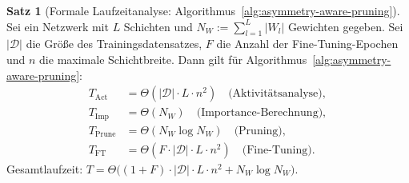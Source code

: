 \documentclass[a4paper,12pt]{report}
\theoremstyle{definition}
\newtheorem{satz}{Satz}
\begin{document}
	\begin{satz}[Formale Laufzeitanalyse: Algorithmus~\ref{alg:asymmetry-aware-pruning}]
		\label{satz:laufzeit-pruning}
		Sei ein Netzwerk mit $L$ Schichten und $N_W := \sum_{l=1}^L |W_l|$ Gewichten gegeben. Sei $|\mathcal{D}|$ die Größe des Trainingsdatensatzes, $F$ die Anzahl der Fine-Tuning-Epochen und $n$ die maximale Schichtbreite. Dann gilt für Algorithmus~\ref{alg:asymmetry-aware-pruning}:
		\begin{align*}
			T_{\mathrm{Act}} &= \Theta(|\mathcal{D}| \cdot L \cdot n^2) \quad \text{(Aktivitätsanalyse)}, \\
			T_{\mathrm{Imp}} &= \Theta(N_W) \quad \text{(Importance-Berechnung)}, \\
			T_{\mathrm{Prune}} &= \Theta(N_W \log N_W) \quad \text{(Pruning)}, \\
			T_{\mathrm{FT}} &= \Theta(F \cdot |\mathcal{D}| \cdot L \cdot n^2) \quad \text{(Fine-Tuning)}.
		\end{align*}
		Gesamtlaufzeit: $T = \Theta\!\bigl((1 + F) \cdot |\mathcal{D}| \cdot L \cdot n^2 + N_W \log N_W\bigr)$.
	\end{satz}
\end{document}
